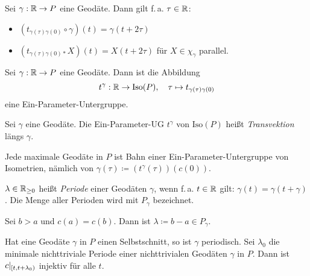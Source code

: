 \documentclass{cheat-sheet}
\newcommand{\Iso}{\mathrm{Iso}} %
\begin{document}
\begin{lem}
  Sei $\gamma : \mathbb{R} \to P$ eine Geodäte. Dann gilt f.\,a. $\tau \in \mathbb{R}$:
  \begin{itemize}
    \item $(t_{\gamma(\tau)\gamma(0)} \circ \gamma)(t) = \gamma(t + 2\tau)$
    \item $(t_{\gamma(\tau)\gamma(0)*} X)(t) = X(t + 2 \tau)$ für $X \in \chi_\gamma$ parallel.
  \end{itemize}
\end{lem}

\begin{lem}
  Sei $\gamma : \mathbb{R} \to P$ eine Geodäte. Dann ist die Abbildung
  \[
    t^\gamma : \R \to \Iso(P), \quad
    \tau \mapsto t_{\gamma(\tau)\gamma(0)}
  \]
  eine Ein-Parameter-Untergruppe.
\end{lem}

\begin{defn}
  Sei $\gamma$ eine Geodäte. Die Ein-Parameter-UG $t^\gamma$ von $\Iso(P)$ heißt \emph{Transvektion} längs $\gamma$.
\end{defn}

\begin{satz}
  Jede maximale Geodäte in $P$ ist Bahn einer Ein-Parameter-Untergruppe von Isometrien, nämlich von $\gamma(\tau) \coloneqq (t^\gamma(\tau))(c(0))$.
\end{satz}

\begin{defn}
  $\lambda \in \mathbb{R}_{\geq 0}$ heißt \emph{Periode} einer Geodäten $\gamma$, wenn f.\,a. $t \in \mathbb{R}$ gilt: $\gamma(t) = \gamma(t + \gamma)$. Die Menge aller Perioden wird mit $P_\gamma$ bezeichnet.
\end{defn}


\begin{lem}
  Sei $b > a$ und $c(a) = c(b)$. Dann ist $\lambda \coloneqq b - a \in P_\gamma$.
\end{lem}

\begin{kor}
  Hat eine Geodäte $\gamma$ in $P$ einen Selbstschnitt, so ist $\gamma$ periodisch. Sei $\lambda_0$ die minimale nichttriviale Periode einer nichttrivialen Geodäten $\gamma$ in $P$. Dann ist $c|_{\left[ t, t+\lambda_0 \right)}$ injektiv für alle $t$.
\end{kor}
\end{document}
